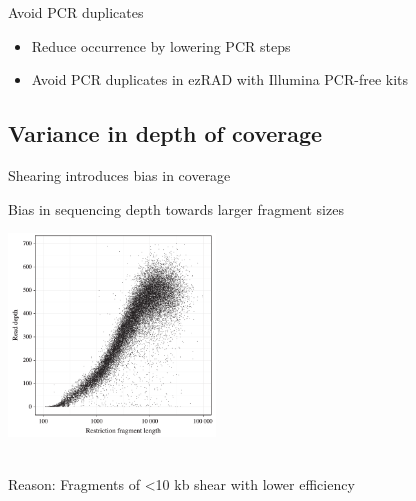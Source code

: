 \documentclass[presentation]{beamer}
\begin{document}
\begin{frame}[label=sec-3-2-4]{Avoid PCR duplicates}
\begin{itemize}
\item Reduce occurrence by lowering PCR steps
\item Avoid PCR duplicates in ezRAD with Illumina PCR-free kits
\end{itemize}
\end{frame}


\subsection{Variance in depth of coverage}
\label{sec-3-3}
\begin{frame}[label=sec-3-3-1]{Shearing introduces bias in coverage}
 \begin{center}
Bias in sequencing depth towards larger fragment sizes

\includegraphics[width=5.5cm]{Davey2013Fig3.png}

 \tiny{\citep{Davey2013}}\\
\normalsize{
Reason: Fragments of <10 kb shear with lower efficiency}
 \end{center}
\end{frame}
\end{document}
